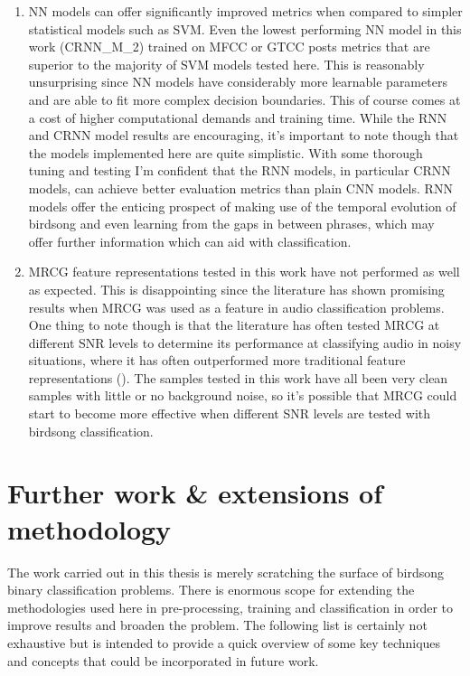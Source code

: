 \begin{enumerate}
  \item NN models can offer significantly improved metrics when compared to
    simpler statistical models such as SVM\@. Even the lowest performing NN
    model in this work (CRNN\_M\_2) trained on MFCC or GTCC posts metrics that
    are superior to the majority of SVM models tested here. This is reasonably
    unsurprising since NN models have considerably more learnable parameters and
    are able to fit more complex decision boundaries. This of course comes at a
    cost of higher computational demands and training time. While the RNN and
    CRNN model results are encouraging, it's important to note though that the
    models implemented here are quite simplistic. With some thorough tuning and
    testing I'm confident that the RNN models, in particular CRNN models, can
    achieve better evaluation metrics than plain CNN models. RNN models offer
    the enticing prospect of making use of the temporal evolution of birdsong
    and even learning from the gaps in between phrases, which may offer further
    information which can aid with classification.

  \item MRCG feature representations tested in this work have not performed as
    well as expected. This is disappointing since the literature has shown
    promising results when MRCG was used as a feature in audio classification
    problems. One thing to note though is that the literature has often tested
    MRCG at different SNR levels to determine its performance at classifying
    audio in noisy situations, where it has often outperformed more traditional
    feature representations (\cite{binti2020comparison,chen2014feature}). The
    samples tested in this work have all been very clean samples with little or
    no background noise, so it's possible that MRCG could start to become more
    effective when different SNR levels are tested with birdsong
    classification.

\end{enumerate}

\section{Further work \& extensions of methodology}

The work carried out in this thesis is merely scratching the surface of birdsong
binary classification problems. There is enormous scope for extending the
methodologies used here in pre-processing, training and classification in order
to improve results and broaden the problem. The following list is certainly not
exhaustive but is intended to provide a quick overview of some key techniques
and concepts that could be incorporated in future work.

